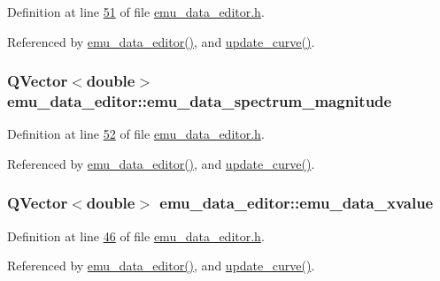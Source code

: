 Definition at line \hyperlink{a00036_source_l00051}{51} of file \hyperlink{a00036_source}{emu\+\_\+data\+\_\+editor.\+h}.



Referenced by \hyperlink{a00035_source_l00012}{emu\+\_\+data\+\_\+editor()}, and \hyperlink{a00035_source_l00284}{update\+\_\+curve()}.

\hypertarget{a00004_ac3c515466f79ab8e60a58e8d15a3b991}{
\subsubsection[{emu\+\_\+data\+\_\+spectrum\+\_\+magnitude}]{\setlength{\rightskip}{0pt plus 5cm}Q\+Vector$<$double$>$ emu\+\_\+data\+\_\+editor\+::emu\+\_\+data\+\_\+spectrum\+\_\+magnitude}}\label{a00004_ac3c515466f79ab8e60a58e8d15a3b991}


Definition at line \hyperlink{a00036_source_l00052}{52} of file \hyperlink{a00036_source}{emu\+\_\+data\+\_\+editor.\+h}.



Referenced by \hyperlink{a00035_source_l00012}{emu\+\_\+data\+\_\+editor()}, and \hyperlink{a00035_source_l00284}{update\+\_\+curve()}.

\hypertarget{a00004_a66d07ec51f26cd9b84994548faa336d6}{
\subsubsection[{emu\+\_\+data\+\_\+xvalue}]{\setlength{\rightskip}{0pt plus 5cm}Q\+Vector$<$double$>$ emu\+\_\+data\+\_\+editor\+::emu\+\_\+data\+\_\+xvalue}}\label{a00004_a66d07ec51f26cd9b84994548faa336d6}


Definition at line \hyperlink{a00036_source_l00046}{46} of file \hyperlink{a00036_source}{emu\+\_\+data\+\_\+editor.\+h}.



Referenced by \hyperlink{a00035_source_l00012}{emu\+\_\+data\+\_\+editor()}, and \hyperlink{a00035_source_l00284}{update\+\_\+curve()}.

